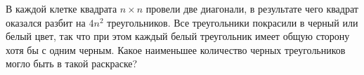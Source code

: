 В каждой клетке квадрата $n \times n$ провели две диагонали, в результате чего квадрат оказался разбит на $4n^2$ треугольников. Все треугольники покрасили в черный или белый цвет, так что при этом каждый белый треугольник имеет общую сторону хотя бы с одним черным. Какое наименьшее количество черных треугольников могло быть в такой раскраске?
